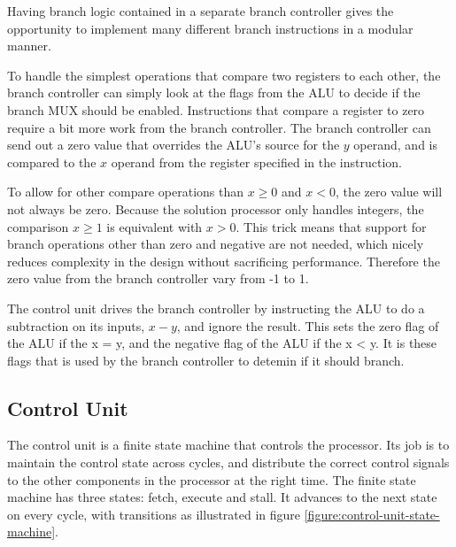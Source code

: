 Having branch logic contained in a separate branch controller gives the opportunity to implement many different branch instructions in a modular manner.

To handle the simplest operations that compare two registers to each other, the branch controller can simply look at the flags from the ALU to decide if the branch MUX should be enabled.
Instructions that compare a register to zero require a bit more work from the branch controller.
The branch controller can send out a zero value that overrides the ALU's source for the $ y $ operand, and is compared to the $ x $ operand from the register specified in the instruction.

To allow for other compare operations than $x \geq 0$ and $x < 0$, the zero value will not always be zero. 
Because the solution processor only handles integers, the comparison $ x \geq 1 $ is equivalent with $ x > 0 $.
This trick means that support for branch operations other than zero and negative are not needed, which nicely reduces complexity in the design without sacrificing performance.
Therefore the zero value from the branch controller vary from -1 to 1.

The control unit drives the branch controller by instructing the ALU to do a subtraction on its inputs, $ x - y $, and ignore the result.
This sets the zero flag of the ALU if the x = y, and the negative flag of the ALU if the x < y.
It is these flags that is used by the branch controller to detemin if it should branch.

\subsection{Control Unit}

The control unit is a finite state machine that controls the processor.
Its job is to maintain the control state across cycles, and distribute the correct control signals to the other components in the processor at the right time.
The finite state machine has three states: fetch, execute and stall.
It advances to the next state on every cycle, with transitions as illustrated in figure \ref{figure:control-unit-state-machine}.

